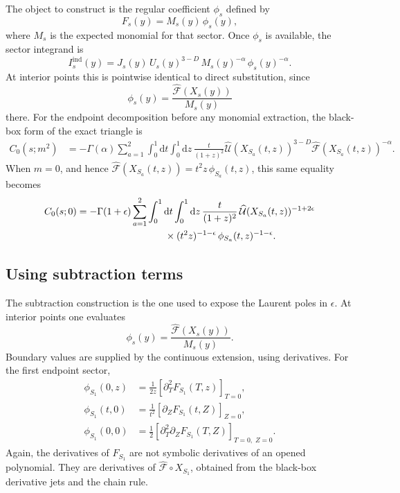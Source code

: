 \documentclass[11pt]{article}
\newcommand{\dd}{\mathrm d}
\newcommand{\eps}{\epsilon}
\newcommand{\hU}{\widehat{\mathcal U}}
\newcommand{\hF}{\widehat{\mathcal F}}
\begin{document}
The object to construct is the regular coefficient \(\phi_s\) defined by
\begin{equation}
  F_s(y)=M_s(y)\,\phi_s(y),
\end{equation}
where \(M_s\) is the expected monomial for that sector.  Once \(\phi_s\) is
available, the sector integrand is
\begin{equation}
  I_s^{\mathrm{ind}}(y)
  =
  J_s(y)\,
  U_s(y)^{3-D}\,
  M_s(y)^{-\alpha}\,
  \phi_s(y)^{-\alpha}.
\end{equation}
At interior points this is pointwise identical to direct substitution, since
\begin{equation}
  \phi_s(y)=\frac{\hF(X_s(y))}{M_s(y)}
\end{equation}
there.
For the endpoint decomposition before any monomial extraction, the black-box
form of the exact triangle is
\begin{align}
  C_0(s;m^2)
  &=
  -\Gamma(\alpha)
  \sum_{a=1}^{2}
  \int_0^1\dd t
  \int_0^1\dd z\,
  \frac{t}{(1+z)^2}
  \hU(X_{S_a}(t,z))^{3-D}
  \hF(X_{S_a}(t,z))^{-\alpha}.
\end{align}
When \(m=0\), and hence
\(\hF(X_{S_a}(t,z))=t^2z\,\phi_{S_a}(t,z)\), this same equality becomes
\begin{align}
  C_0(s;0)
  &=
  -\Gamma(1+\eps)
  \sum_{a=1}^{2}
  \int_0^1\dd t
  \int_0^1\dd z\,
  \frac{t}{(1+z)^2}\,
  \hU(X_{S_a}(t,z))^{-1+2\eps}
  \notag\\
  &\hspace{3.2cm}\times
  (t^2z)^{-1-\eps}\,
  \phi_{S_a}(t,z)^{-1-\eps}.
\end{align}

\subsection{Using subtraction terms}

The subtraction construction is the one used to expose the Laurent poles in
\(\eps\).  At interior points one evaluates
\begin{equation}
  \phi_s(y)=\frac{\hF(X_s(y))}{M_s(y)}.
\end{equation}
Boundary values are supplied by the continuous extension, using derivatives.
For the first endpoint sector,
\begin{align}
  \phi_{S_1}(0,z)
  &=
  \frac{1}{2z}
  \left[
    \partial_T^2 F_{S_1}(T,z)
  \right]_{T=0},
  \\
  \phi_{S_1}(t,0)
  &=
  \frac{1}{t^2}
  \left[
    \partial_Z F_{S_1}(t,Z)
  \right]_{Z=0},
  \\
  \phi_{S_1}(0,0)
  &=
  \frac12
  \left[
    \partial_T^2\partial_Z F_{S_1}(T,Z)
  \right]_{T=0,\;Z=0}.
\end{align}
Again, the derivatives of \(F_{S_1}\) are not symbolic derivatives of an opened
polynomial.  They are derivatives of \(\hF\circ X_{S_1}\), obtained from the
black-box derivative jets and the chain rule.
\end{document}
